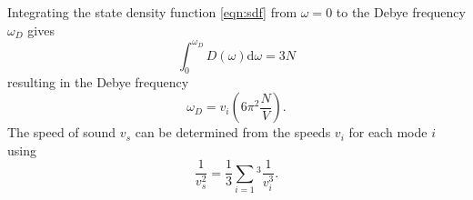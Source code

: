 Integrating the state density function \eqref{eqn:sdf} from 
$\omega=0$ to the Debye frequency $\omega_D$ gives
\begin{equation}
    \int_0^{\omega_D}D(\omega)\text{d}\omega=3N
\end{equation}
resulting in the Debye frequency
\begin{equation}
    \omega_D=v_i\left(6\pi^2\frac{N}{V}\right).
\end{equation}
The speed of sound $v_s$ can be determined from the speeds $v_i$ for each mode $i$ using
\begin{equation}
    \frac{1}{v_s^2}=\frac{1}{3}\sum_{i=1}{^3}\frac{1}{v_i^3}.
\end{equation}